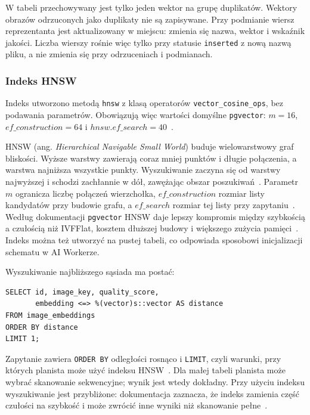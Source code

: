 W tabeli przechowywany jest tylko jeden wektor na grupę duplikatów.
Wektory obrazów odrzuconych jako duplikaty nie są zapisywane. Przy
podmianie wiersz reprezentanta jest aktualizowany w miejscu: zmienia
się nazwa, wektor i wskaźnik jakości. Liczba wierszy rośnie więc tylko przy statusie \texttt{inserted}
z nową nazwą pliku, a nie zmienia się przy odrzuceniach i podmianach.

\subsubsection{Indeks HNSW}

Indeks utworzono metodą \texttt{hnsw} z klasą operatorów
\texttt{vector\_\allowbreak cosine\_\allowbreak ops}, bez podawania
parametrów. Obowiązują więc wartości domyślne \texttt{pgvector}:
\(m=16\), \(\mathit{ef\_construction}=64\)
i \(\mathit{hnsw.ef\_search}=40\)~\cite{pgvector_docs}.

HNSW (ang. \textit{Hierarchical Navigable Small World}) buduje
wielowarstwowy graf bliskości. Wyższe warstwy zawierają coraz mniej
punktów i długie połączenia, a warstwa najniższa wszystkie punkty.
Wyszukiwanie zaczyna się od warstwy najwyższej i schodzi zachłannie
w dół, zawężając obszar poszukiwań~\cite{malkov2020hnsw}. Parametr
\(m\) ogranicza liczbę połączeń wierzchołka, \(\mathit{ef\_construction}\)
rozmiar listy kandydatów przy budowie grafu, a \(\mathit{ef\_search}\)
rozmiar tej listy przy zapytaniu~\cite{malkov2020hnsw,pgvector_docs}.
Według dokumentacji \texttt{pgvector} HNSW daje lepszy kompromis
między szybkością a czułością niż IVFFlat, kosztem dłuższej budowy
i większego zużycia pamięci~\cite{pgvector_docs}. Indeks można
też utworzyć na pustej tabeli, co odpowiada sposobowi inicjalizacji
schematu w AI Workerze.

Wyszukiwanie najbliższego sąsiada ma postać:

\begin{lstlisting}[basicstyle=\ttfamily\small,breaklines=true]
SELECT id, image_key, quality_score,
       embedding <=> %(vector)s::vector AS distance
FROM image_embeddings
ORDER BY distance
LIMIT 1;
\end{lstlisting}

Zapytanie zawiera \texttt{ORDER BY} odległości rosnąco i
\texttt{LIMIT}, czyli warunki, przy których planista może użyć indeksu
HNSW~\cite{pgvector_docs}. Dla małej tabeli planista może wybrać
skanowanie sekwencyjne; wynik jest wtedy dokładny. Przy użyciu indeksu
wyszukiwanie jest przybliżone: dokumentacja zaznacza, że indeks
zamienia część czułości na szybkość i może zwrócić inne wyniki niż
skanowanie pełne~\cite{pgvector_docs}.

